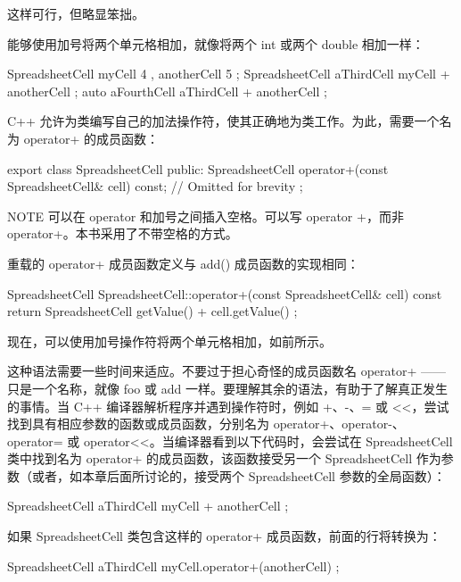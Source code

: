 这样可行，但略显笨拙。


能够使用加号将两个单元格相加，就像将两个 int 或两个 double 相加一样：

\begin{cpp}
SpreadsheetCell myCell { 4 }, anotherCell { 5 };
SpreadsheetCell aThirdCell { myCell + anotherCell };
auto aFourthCell { aThirdCell + anotherCell };
\end{cpp}

C++ 允许为类编写自己的加法操作符，使其正确地为类工作。为此，需要一个名为 operator+ 的成员函数：

\begin{cpp}
export class SpreadsheetCell
{
    public:
        SpreadsheetCell operator+(const SpreadsheetCell& cell) const;
        // Omitted for brevity
};
\end{cpp}

\begin{myNotic}{NOTE}
可以在 operator 和加号之间插入空格。可以写 operator +，而非 operator+。本书采用了不带空格的方式。
\end{myNotic}

重载的 operator+ 成员函数定义与 add() 成员函数的实现相同：

\begin{cpp}
SpreadsheetCell SpreadsheetCell::operator+(const SpreadsheetCell& cell) const
{
    return SpreadsheetCell { getValue() + cell.getValue() };
}
\end{cpp}

现在，可以使用加号操作符将两个单元格相加，如前所示。

这种语法需要一些时间来适应。不要过于担心奇怪的成员函数名 operator+ ——只是一个名称，就像 foo 或 add 一样。要理解其余的语法，有助于了解真正发生的事情。当 C++ 编译器解析程序并遇到操作符时，例如 +、-、= 或 <{}<，尝试找到具有相应参数的函数或成员函数，分别名为 operator+、operator-、operator= 或 operator<{}<。当编译器看到以下代码时，会尝试在 SpreadsheetCell 类中找到名为 operator+ 的成员函数，该函数接受另一个 SpreadsheetCell 作为参数（或者，如本章后面所讨论的，接受两个 SpreadsheetCell 参数的全局函数）：

\begin{cpp}
SpreadsheetCell aThirdCell { myCell + anotherCell };
\end{cpp}

如果 SpreadsheetCell 类包含这样的 operator+ 成员函数，前面的行将转换为：

\begin{cpp}
SpreadsheetCell aThirdCell { myCell.operator+(anotherCell) };
\end{cpp}

